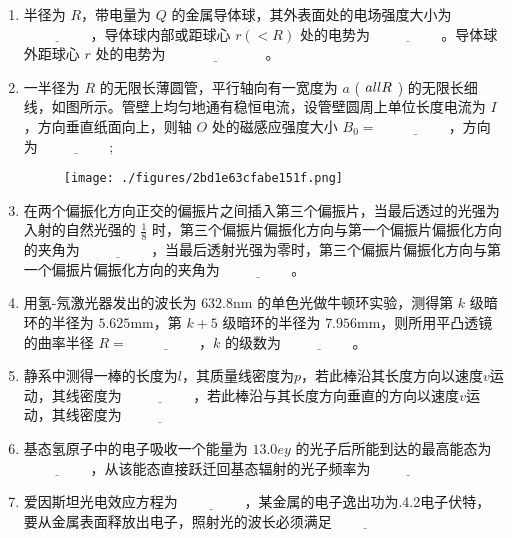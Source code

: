     \begin{enumerate}
    \item 半径为 $R$，带电量为 $Q$ 的金属导体球，其外表面处的电场强度大小为 $\underline{\hspace{2cm}}$，导体球内部或距球心 $r (< R)$ 处的电势为 $\underline{\hspace{2cm}}$。导体球外距球心 $r$ 处的电势为$ \underline{\hspace{3cm}}$。
    \item 一半径为 $R$ 的无限长薄圆管，平行轴向有一宽度为 $a$ ( $a \\ll R$ ) 的无限长细线，如图所示。管壁上均匀地通有稳恒电流，设管壁圆周上单位长度电流为 $I$，方向垂直纸面向上，则轴 $O$ 处的磁感应强度大小 $B_0 =$ $\underline{\hspace{2cm}}$，方向为 $\underline{\hspace{2cm}}$;
    \begin{figure}[ht]
    \centering
    \texttt{[image: ./figures/2bd1e63cfabe151f.png]}
    \caption{} \label{fig_NIU06_3}
    \end{figure}
    \item 在两个偏振化方向正交的偏振片之间插入第三个偏振片，当最后透过的光强为入射的自然光强的 $\frac{1}{8}$ 时，第三个偏振片偏振化方向与第一个偏振片偏振化方向的夹角为 $\underline{\hspace{2cm}}$，当最后透射光强为零时，第三个偏振片偏振化方向与第一个偏振片偏振化方向的夹角为 $\underline{\hspace{2cm}}$。
    \item 用氢-氖激光器发出的波长为 $632.8\text{nm}$ 的单色光做牛顿环实验，测得第 $k$ 级暗环的半径为 $5.625\text{mm}$，第 $k+5$ 级暗环的半径为 $7.956\text{mm}$，则所用平凸透镜的曲率半径 $R =$ $\underline{\hspace{2cm}}$，$k$ 的级数为 $\underline{\hspace{2cm}}$。
    \item 静系中测得一棒的长度为$l$，其质量线密度为$p$，若此棒沿其长度方向以速度$v$运动，其线密度为 $\underline{\hspace{2cm}}$，若此棒沿与其长度方向垂直的方向以速度$v$运动，其线密度为 $\underline{\hspace{2cm}}$
    \item 基态氢原子中的电子吸收一个能量为 $13.0ey$ 的光子后所能到达的最高能态为  $\underline{\hspace{2cm}}$，从该能态直接跃迁回基态辐射的光子频率为 $\underline{\hspace{2cm}}$
    \item 爱因斯坦光电效应方程为$\underline{\hspace{2cm}}$，某金属的电子逸出功为.4.2电子伏特，要从金属表面释放出电子，照射光的波长必须满足$\underline{\hspace{2cm}}$
\end{enumerate}

